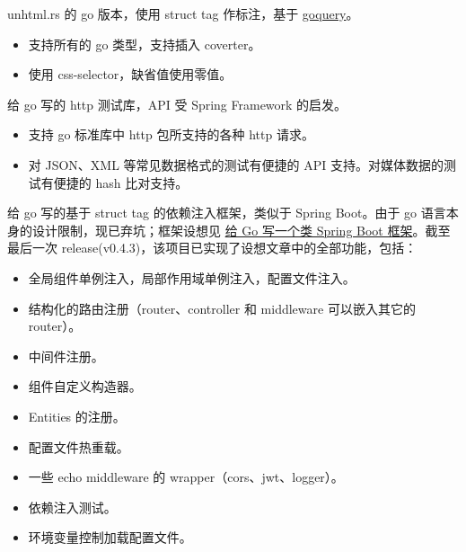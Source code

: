 \documentclass{resume}
\begin{document}
unhtml.rs 的 go 版本，使用 struct tag 作标注，基于 \href{github.com/PuerkitoBio/goquery} {goquery}。
\begin{itemize}
  \item 支持所有的 go 类型，支持插入 coverter。 
  \item 使用 css-selector，缺省值使用零值。
\end{itemize}

 给 go 写的 http 测试库，API 受 Spring Framework 的启发。
\begin{itemize}
  \item 支持 go 标准库中 http 包所支持的各种 http 请求。
  \item 对 JSON、XML 等常见数据格式的测试有便捷的 API 支持。对媒体数据的测试有便捷的 hash 比对支持。
\end{itemize}

给 go 写的基于 struct tag 的依赖注入框架，类似于 Spring Boot。由于 go 语言本身的设计限制，现已弃坑；框架设想见 \href{https://zhuanlan.zhihu.com/p/32616898} {给 Go 写一个类 Spring Boot 框架}。截至最后一次 release(v0.4.3)，该项目已实现了设想文章中的全部功能，包括：
\begin{itemize}
  \item 全局组件单例注入，局部作用域单例注入，配置文件注入。
  \item 结构化的路由注册（router、controller 和 middleware 可以嵌入其它的 router）。
  \item 中间件注册。
  \item 组件自定义构造器。
  \item Entities 的注册。
  \item 配置文件热重载。
  \item 一些 echo middleware 的 wrapper（cors、jwt、logger）。
  \item 依赖注入测试。
  \item 环境变量控制加载配置文件。
\end{itemize}
\end{document}
